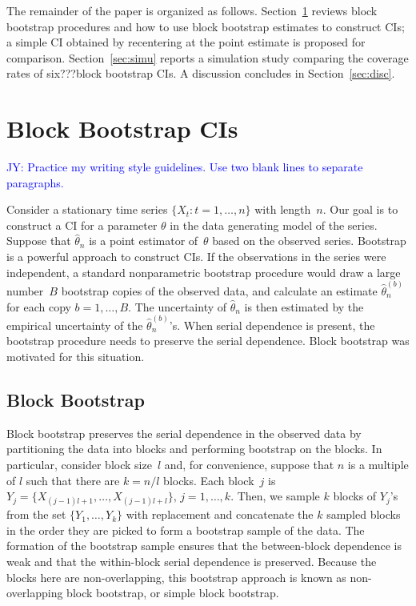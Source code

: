 \documentclass[12pt, letterpaper, titlepage]{article}
\newcommand{\jy}[1]{\textcolor{blue}{JY: #1}}
\begin{document}
The remainder of the paper is organized as follows.
Section~\ref{sec:bbci} reviews block bootstrap procedures and how to use block
bootstrap estimates to construct CIs; a simple CI obtained by recentering at the
point estimate is proposed for comparison. Section~\ref{sec:simu} reports a
simulation
study comparing the coverage rates of six???block bootstrap CIs. A discussion
concludes in Section~\ref{sec:disc}.

\section{Block Bootstrap CIs}
\label{sec:bbci}


\jy{Practice my writing style guidelines. Use two blank lines to separate
  paragraphs.}

Consider a stationary time series $\{X_t: t = 1, \ldots, n\}$ with length~$n$.
Our goal is to construct a CI for a parameter $\theta$ in the
data generating model of the series. Suppose that $\hat\theta_n$ is a point
estimator of~$\theta$ based on the observed series. Bootstrap is a powerful
approach to construct CIs. If the observations in the series
were independent, a standard nonparametric bootstrap procedure would draw a
large number~$B$ bootstrap copies of the observed data, and calculate an
estimate $\hat\theta_n^{(b)}$ for each copy $b = 1, \ldots, B$. The uncertainty
of $\hat\theta_n$ is then estimated by the empirical uncertainty of the
$\hat\theta_n^{(b)}$'s. When serial dependence is present, the bootstrap
procedure needs to preserve the serial dependence. Block bootstrap was
motivated for this situation. 

\subsection{Block Bootstrap}

Block bootstrap preserves the serial dependence in the observed data by
partitioning the data into blocks and performing bootstrap on the blocks.
In particular, consider block size~$l$ and, for convenience, suppose that
$n$ is a multiple of $l$ such that there are $k = n / l$ blocks. Each block~$j$
is $Y_j = \{X_{(j - 1) l + 1}, \ldots, X_{(j - 1) l + l}\}$,
$j = 1, \ldots,   k$.  Then, we sample $k$ blocks of $Y_j$'s from the set 
$\{Y_1, \ldots, Y_k\}$ with replacement and concatenate the $k$ sampled blocks
in the order they are picked to form a bootstrap sample of the data. The
formation of the bootstrap sample ensures that the between-block dependence is
weak and that the within-block serial dependence is preserved. Because the
blocks here are non-overlapping, this bootstrap approach is known as
non-overlapping block bootstrap, or simple block bootstrap.
\end{document}
